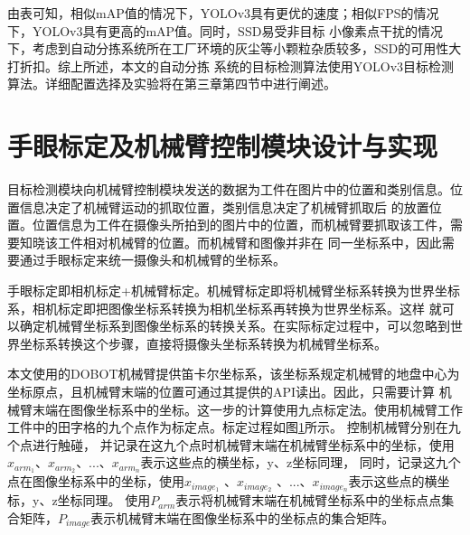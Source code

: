 由表可知，相似mAP值的情况下，YOLOv3具有更优的速度；相似FPS的情况下，YOLOv3具有更高的mAP值。同时，SSD易受非目标
小像素点干扰的情况下，考虑到自动分拣系统所在工厂环境的灰尘等小颗粒杂质较多，SSD的可用性大打折扣。综上所述，本文的自动分拣
系统的目标检测算法使用YOLOv3目标检测算法。详细配置选择及实验将在第三章第四节中进行阐述。


\section{手眼标定及机械臂控制模块设计与实现}

目标检测模块向机械臂控制模块发送的数据为工件在图片中的位置和类别信息。位置信息决定了机械臂运动的抓取位置，类别信息决定了机械臂抓取后
的放置位置。位置信息为工件在摄像头所拍到的图片中的位置，而机械臂要抓取该工件，需要知晓该工件相对机械臂的位置。而机械臂和图像并非在
同一坐标系中，因此需要通过手眼标定来统一摄像头和机械臂的坐标系。

手眼标定即相机标定+机械臂标定。机械臂标定即将机械臂坐标系转换为世界坐标系，相机标定即把图像坐标系转换为相机坐标系再转换为世界坐标系。这样
就可以确定机械臂坐标系到图像坐标系的转换关系。在实际标定过程中，可以忽略到世界坐标系转换这个步骤，直接将摄像头坐标系转换为机械臂坐标系。

本文使用的DOBOT机械臂提供笛卡尔坐标系，该坐标系规定机械臂的地盘中心为坐标原点，且机械臂末端的位置可通过其提供的API读出。因此，只需要计算
机械臂末端在图像坐标系中的坐标。这一步的计算使用九点标定法。使用机械臂工作工件中的田字格的九个点作为标定点。标定过程如图\ref{}所示。
控制机械臂分别在九个点进行触碰，
并记录在这九个点时机械臂末端在机械臂坐标系中的坐标，使用$x_{arm_{1}}$、$x_{arm_{2}}$、...、$x_{arm_{n}}$表示这些点的横坐标，y、z坐标同理，
同时，记录这九个点在图像坐标系中的坐标，使用$x_{image_{1}}$ 、$x_{image_{2}}$ 、...、$x_{image_{n}}$表示这些点的横坐标，y、z坐标同理。
使用$P_{arm}$表示将机械臂末端在机械臂坐标系中的坐标点点集合矩阵，$P_{image}$表示机械臂末端在图像坐标系中的坐标点的集合矩阵。


